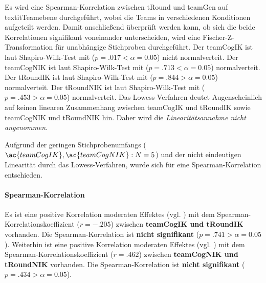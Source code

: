 \documentclass[a4paper,11pt]{article}%
\renewcommand{\\}{\vspace*{0.5\baselineskip} \newline}
\begin{document}
Es wird eine Spearman-Korrelation zwischen \ac{tRound} und \ac{teamGen} auf textit{Teamebene} durchgeführt, wobei die Teams in verschiedenen Konditionen aufgeteilt werden. Damit anschließend überprüft werden kann, ob sich die beide Korrelationen signifikant voneinander unterscheiden, wird eine Fischer-Z-Transformation für unabhängige Stichproben durchgeführt.\\
%
Der \ac{teamCogIK} ist laut Shapiro-Wilk-Test mit ($p = .017 < \alpha = 0.05$) nicht normalverteit. \newline
Der \ac{teamCogNIK} ist laut Shapiro-Wilk-Test mit ($p = .713 < \alpha = 0.05$) normalverteit. \newline
Der \ac{tRoundIK} ist laut Shapiro-Wilk-Test mit ($p = .844 > \alpha = 0.05$) normalverteit. \newline
Der \ac{tRoundNIK} ist laut Shapiro-Wilk-Test mit ($p = .453 > \alpha = 0.05$) normalverteit. \\
Das Lowess-Verfahren deutet Augenscheinlich auf keinen linearen Zusammenhang zwischen \ac{teamCogIK} und \ac{tRoundIK} sowie \ac{teamCogNIK} und \ac{tRoundNIK} hin. Daher wird die \textit{Linearitätsannahme nicht angenommen}.

Aufgrund der geringen Stichprobenumfangs ($\ac{teamCogIK}, \ac{teamCogNIK} : N=5$) und der nicht eindeutigen Linearität durch das Lowess-Verfahren, wurde sich für eine Spearman-Korrelation entschieden.

\paragraph{Spearman-Korrelation}
Es ist eine positive Korrelation moderaten Effektes (vgl. \cite{cohen2013statistical}) mit dem Spearman-Korrelationskoeffizient ($r = -.205$) zwischen \textbf{\ac{teamCogIK} und \ac{tRoundIK}} vorhanden. Die Spearman-Korrelation ist \textbf{nicht signifikant} ($p = .741 > \alpha = 0.05$).\\
Weiterhin ist eine positive Korrelation moderaten Effektes (vgl. \cite{cohen2013statistical}) mit dem Spearman-Korrelationskoeffizient ($r = .462$) zwischen \textbf{\ac{teamCogNIK} und \ac{tRoundNIK}} vorhanden. Die Spearman-Korrelation ist \textbf{nicht signifikant} ($p = .434 > \alpha = 0.05$).
\end{document}
